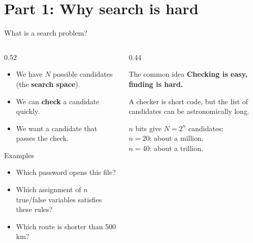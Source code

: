 \documentclass[aspectratio=169,11pt]{beamer}
\newcommand{\key}[1]{{\color{qdark}\textbf{#1}}}
\begin{document}
\section{Part 1: Why search is hard}
\begin{frame}{What is a search problem?}
  \begin{columns}[T]
    \begin{column}{0.52\textwidth}
      \begin{itemize}
        \item We have $N$ possible candidates (the \key{search space}).
        \item We can \key{check} a candidate quickly.
        \item We want a candidate that passes the check.
      \end{itemize}
      \vspace{2mm}
      \begin{block}{Examples}
        \begin{itemize}
          \item Which password opens this file?
          \item Which assignment of $n$ true/false variables satisfies these rules?
          \item Which route is shorter than 500 km?
        \end{itemize}
      \end{block}
    \end{column}
    \begin{column}{0.44\textwidth}
      \begin{exampleblock}{The common idea}
        \centering \textbf{Checking is easy, finding is hard.}\\[1mm]
        \raggedright A checker is short code, but the list of candidates can be astronomically long.
      \end{exampleblock}
      \vspace{1mm}
      $n$ bits give $N = 2^n$ candidates:\\
      $n = 20$: about a million.\\
      $n = 40$: about a trillion.
    \end{column}
  \end{columns}
\end{frame}
\end{document}
